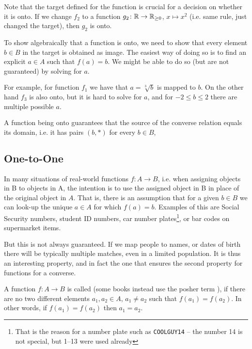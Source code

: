 Note that the target defined for the function is crucial for a decision on
whether it is onto. If we change $f_2$ to a function $g_2\colon{\mathbb R}\to{\mathbb R}_{\ge
0}$, $x\mapsto x^2$ (i.e. same rule, just changed the target), then $g_2$ is
onto.
\medskip

To show algebraically that a function is onto, we need to show that every
element $b\in B$ in the target is obtained as image. The easiest way of
doing so is to find an explicit $a\in A$ such that $f(a)=b$. We might be
able to do so (but are not guaranteed) by solving for $a$.

For example, for function $f_1$ we have that $a=\sqrt[3]{b}$ is mapped to
$b$. On the other hand $f_3$ is also onto, but it is hard to solve for $a$,
and for $-2\le b\le 2$ there are multiple possible $a$.
\smallskip

A function being onto guarantees that the source of the converse relation
equals its domain, i.e. it has pairs
$(b,*)$ for every $b\in B$, 

\subsection{One-to-One}

In many situations of real-world functions $f\colon A\to B$, i.e. when
assigning objects in B to objects in A, the
intention is to use the assigned object in B in place of the original object in $A$.
That is, there is an assumption that for a given $b\in B$ we can look-up the unique
$a\in A$ for which $f(a)=b$. Examples of this are Social Security numbers, student ID
numbers, car number plates\footnote{That is the reason for a number plate such as
\texttt{COOLGUY14} -- the number 14 is not special, but 1--13 were used already},
or bar codes on supermarket items.

But this is not always guaranteed. If we map people to names, or dates of birth there
will be typically multiple matches, even in a limited population. It is thus an
interesting property, and in fact the one that ensures the second property for functions
for a converse.

\begin{defn}
A function $f\colon A\to B$ is called  (some books instead use the posher
term ), if there are no two different elements $a_1,a_2\in A$,
$a_1\not=a_2$ such that $f(a_1)=f(a_2)$. In other words, if $f(a_1)=f(a_2)$ then
$a_1=a_2$.
\end{defn}

